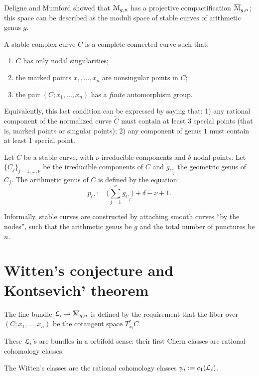 Deligne and Mumford \cite{deligne-mumford} showed that $\mathcal{M}_{g,n}$ has
a projective compactification $\overline{\mathcal{M}}_{g,n}$; this space can be
described as the moduli space of stable curves of arithmetic genus
$g$.
\begin{definition}
  A stable complex curve $C$ is a complete connected curve such that:
  \begin{enumerate}
  \item $C$ has only nodal singularities;
  \item the marked points $x_1, \ldots, x_n$ are nonsingular points in
    $C$;
  \item the pair $(C; x_1, \ldots, x_n)$ has a \emph{finite} automorphism
    group.
  \end{enumerate}
\end{definition}
Equivalently, this last condition can be expressed by saying that: 1)
any rational component of the normalized curve $\tilde C$ must contain
at least 3 special points (that is, marked points or singular points);
2) any component of genus $1$ must contain at least 1 special point.
\begin{definition}
  Let $C$ be a stable curve, with $\nu$ irreducible components and
  $\delta$ nodal points. Let $\{C_j\}_{j=1, \dots, \nu}$ be the
  irreducible components of $C$ and $g_{C_j}^{}$ the geometric genus
  of $C_j$.  The arithmetic genus of $C$ is defined by the equation:
  \begin{equation*}
    p_C^{} := \bigl({\textstyle \sum_{j=1}^\nu} g_{C_j}^{} \bigr) + \delta - \nu + 1.
  \end{equation*}
\end{definition}

Informally, stable curves are constructed by attaching smooth curves
``by the nodes'', such that the arithmetic genus be $g$ and the total
number of punctures be $n$.


\section{Witten's conjecture and Kontsevich' theorem}
\label{sec:witten-classes}

\begin{definition}
  The line bundle $\mathcal{L}_i \to \overline{\mathcal{M}}_{g,n}$ is defined by the requirement
  that the fiber over $(C; x_1, \ldots, x_n)$ be the cotangent space
  $T^*_{x_i} C$.
\end{definition}
These $\mathcal{L}_i$'s are bundles in a orbifold sense: their first Chern
classes are rational cohomology classes.
\begin{definition}
  The Witten's classes are the rational cohomology classes $\psi_i :=
  c_1({\mathcal{L}}_i)$.
\end{definition}

